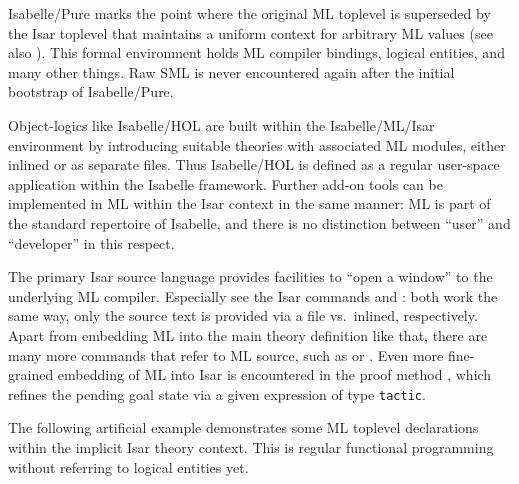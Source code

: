 \begin{isabellebody}
\begin{isamarkuptext}
  Isabelle/Pure marks the point where the original ML toplevel is
  superseded by the Isar toplevel that maintains a uniform context for
  arbitrary ML values (see also ).  This formal
  environment holds ML compiler bindings, logical entities, and many
  other things.  Raw SML is never encountered again after the initial
  bootstrap of Isabelle/Pure.

  Object-logics like Isabelle/HOL are built within the
  Isabelle/ML/Isar environment by introducing suitable theories with
  associated ML modules, either inlined or as separate files.  Thus
  Isabelle/HOL is defined as a regular user-space application within
  the Isabelle framework.  Further add-on tools can be implemented in
  ML within the Isar context in the same manner: ML is part of the
  standard repertoire of Isabelle, and there is no distinction between
  ``user'' and ``developer'' in this respect.%
\end{isamarkuptext}%
\isamarkuptrue%
%
\isamarkuptrue%
%
\begin{isamarkuptext}%
The primary Isar source language provides facilities to ``open
  a window'' to the underlying ML compiler.  Especially see the Isar
  commands \hyperlink{command.use}{\mbox{}} and \hyperlink{command.ML}{\mbox{}}: both work the
  same way, only the source text is provided via a file vs.\ inlined,
  respectively.  Apart from embedding ML into the main theory
  definition like that, there are many more commands that refer to ML
  source, such as \hyperlink{command.setup}{\mbox{}} or \hyperlink{command.declaration}{\mbox{}}.
  Even more fine-grained embedding of ML into Isar is encountered in
  the proof method \hyperlink{method.tactic}{\mbox{}}, which refines the pending
  goal state via a given expression of type \verb|tactic|.%
\end{isamarkuptext}%
\isamarkuptrue%
%
\isadelimmlex
%
\endisadelimmlex
%
\isatagmlex
%
\begin{isamarkuptext}%
The following artificial example demonstrates some ML
  toplevel declarations within the implicit Isar theory context.  This
  is regular functional programming without referring to logical
  entities yet.%
\end{isamarkuptext}%
\isamarkuptrue%
%
\endisatagmlex

\end{isabellebody}
